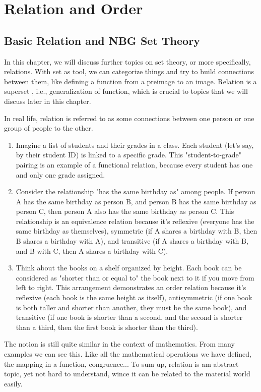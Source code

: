 \chapterspaceabove{6.75cm} 
\chapterspacebelow{7.25cm} 
\chapter{Relation and Order}

\section{Basic Relation and NBG Set Theory}
In this chapter, we will discuss further topics on set theory, or more specifically, 
relations. With set as tool, we can categorize things and try to build connections 
between them, like defining a function from a preimage to an image. Relation is a superset
, i.e., generalization of function, which is crucial to topics that we will discuss
later in this chapter.

In real life, relation is referred to as some connections between one person or 
one group of people to the other. 
\begin{enumerate}
    \item Imagine a list of students and their grades in a class. Each student 
    (let's say, by their student ID) is linked to a specific grade. 
    This "student-to-grade" pairing is an example of a functional relation, 
    because every student has one and only one grade assigned.
    \item Consider the relationship "has the same birthday as" among people. If person A has the same birthday as person B, and person B has the same birthday as person C, then person A also has the same birthday as person C. This relationship is an equivalence relation because it's reflexive (everyone has the same birthday as themselves), symmetric (if A shares a birthday with B, then B shares a birthday with A), and transitive (if A shares a birthday with B, and B with C, then A shares a birthday with C).
    \item Think about the books on a shelf organized by height. Each book can be considered as "shorter than or equal to" the book next to it if you move from left to right. This arrangement demonstrates an order relation because it's reflexive (each book is the same height as itself), antisymmetric (if one book is both taller and shorter than another, they must be the same book), and transitive (if one book is shorter than a second, and the second is shorter than a third, then the first book is shorter than the third).
\end{enumerate} 
The notion is still quite similar in the context of
mathematics. From many examples we can see this. Like all the mathematical operations
we have defined, the mapping in a function, congruence...
To sum up, relation is am abstract topic, yet not hard to understand, wince it can be
related to the material world easily. 
